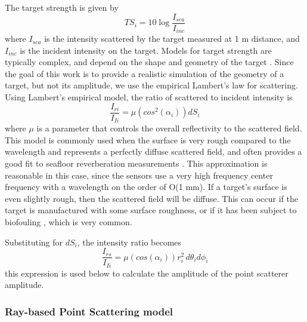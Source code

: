 \documentclass[utf8]{frontiersSCNS} %
\begin{document}
The target strength is given by 
\begin{equation}
    TS_i = 10 \log\frac{I_{sca}}{I_{inc}}
\end{equation}
where $I_{sca}$ is the intensity scattered by the target measured at 1 m distance, and $I_{inc}$ is the incident intensity on the target. Models for target strength are typically complex, and depend on the shape and geometry of the target \citep{Williams2010,Kargl2015,Espana2014}. Since the goal of this work is to provide a realistic simulation of the geometry of a target, but not its amplitude, we use the empirical Lambert's law for scattering. Using Lambert's empirical model, the ratio of scattered to incident intensity is
\begin{equation}
    \frac{I_{ri}}{I_{Ii}} = \mu \left(cos^2(\alpha_i)\right) dS_i
\end{equation}
where $\mu$ is a parameter that controls the overall reflectivity to the scattered field. This model is commonly used when the surface is very rough compared to the wavelength and represents a perfectly diffuse scattered field, and often provides a good fit to seafloor reverberation measurements \citep{Lambert1760,Prior2005,Holland2005,Olson2016_rockScatteringStrength,Boehme1984}. This approximation is reasonable in this case, since the sensors use a very high frequency center frequency with a wavelength on the order of O(1 mm). If a target's surface is even slightly rough, then the scattered field will be diffuse. This can occur if the target is manufactured with some surface roughness, or if it has been subject to biofouling \citep{Lewis1998}, which is very common.

Substituting for $dS_i$, the intensity ratio becomes
\begin{equation}
    \frac{I_{rs}}{I_{Ii}}= \mu \left(cos(\alpha_i)\right) r_i^2 \, d\theta_id\phi_i
\end{equation}
this expression is used below to calculate the amplitude of the point scatterer amplitude.

\subsubsection{Ray-based Point Scattering model}
\end{document}
